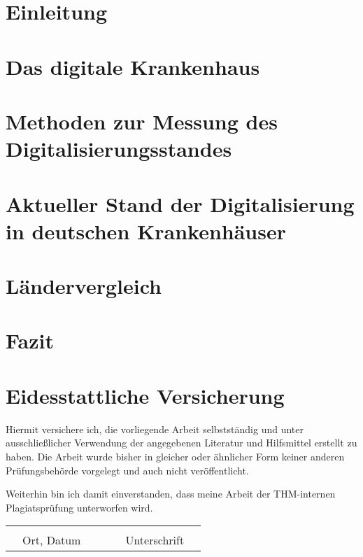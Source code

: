 
% 
{}
\section{Einleitung}

\section{Das digitale Krankenhaus}

\section{Methoden zur Messung des Digitalisierungsstandes}

\section{Aktueller Stand der Digitalisierung in deutschen Krankenhäuser} \label{sec:stand in deutschland}

\section{Ländervergleich} \label{sec:laendervergleich}

\section{Fazit}

\newpage
{}
\setcounter{page}{3}
\listoftables
\newpage
\listoffigures
\newpage
\printbibliography
{}
\newpage
{}
\section*{Eidesstattliche Versicherung}
Hiermit versichere ich, die vorliegende Arbeit selbstständig und unter ausschließlicher Verwendung der angegebenen Literatur und Hilfsmittel erstellt zu haben. Die Arbeit wurde bisher in gleicher oder ähnlicher Form keiner anderen Prüfungsbehörde vorgelegt und auch nicht veröffentlicht.

Weiterhin bin ich damit einverstanden, dass meine Arbeit der THM-internen Plagiatsprüfung unterworfen wird.
\begin{table}[ht]
   \centering 
    \begin{tabular}{cc cp{4cm}c cc}
    &&&&&&\\\cline{1-3}\cline{5-7}
    &Ort, Datum &&&& Unterschrift&\\
    \end{tabular}
\end{table}

